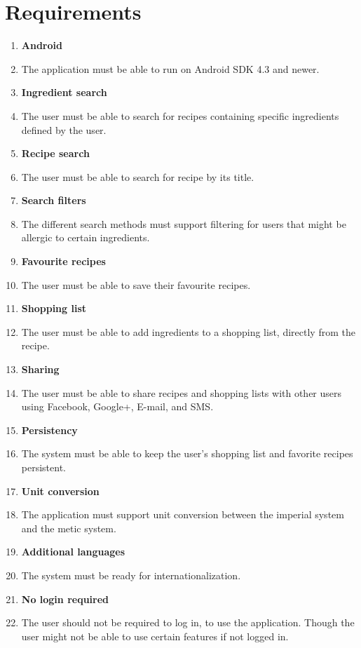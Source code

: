 \section{Requirements}
\begin{enumerate}
  \item\label{req:android} \textbf{Android} 
    \item [] The application must be able to run on Android SDK 4.3 and newer.
    
  \item\label{req:ingredientsearch} \textbf{Ingredient search} 
    \item [] The user must be able to search for recipes containing specific ingredients defined by the user.
    
  \item\label{req:recipesearch} \textbf{Recipe search} 
    \item [] The user must be able to search for recipe by its title.
    
  \item\label{req:searchfilters} \textbf{Search filters} 
    \item [] The different search methods must support filtering for users that might be allergic to certain ingredients.
    
  \item\label{req:favourite} \textbf{Favourite recipes} 
    \item [] The user must be able to save their favourite recipes.
    
  \item\label{req:shoppinglist} \textbf{Shopping list} 
    \item [] The user must be able to add ingredients to a shopping list, directly from the recipe.
    
  \item\label{req:sharing} \textbf{Sharing} 
    \item [] The user must be able to share recipes and shopping lists with other users using Facebook, Google+, E-mail, and SMS.
    
  \item\label{req:persistency} \textbf{Persistency} 
    \item [] The system must be able to keep the user's shopping list and favorite recipes persistent.
    
  \item\label{req:unitconversion} \textbf{Unit conversion} 
    \item [] The application must support unit conversion between the imperial system and the metic system.
    
  \item\label{req:additionallanguages} \textbf{Additional languages} 
    \item [] The system must be ready for internationalization.
  
  \item\label{req:Nologinrequired} \textbf{No login required}
    \item [] The user should not be required to log in, to use the application. Though the user might not be able to use certain features if not logged in.
\end{enumerate}